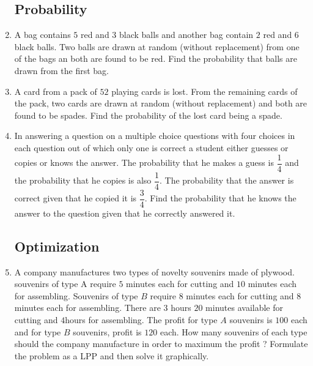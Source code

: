 \documentclass[12pt,-letter paper]{article}
\begin{document}
\begin{enumerate}
\subsection*{ Probability}
\item A bag contains $5$ red and $3$ black balls and another bag contain $2$ red and $6$ black balls. Two balls are drawn at random (without replacement) from one of the bags an both are found to be red. Find the probability that balls are drawn from the first bag.                 
\item A card from a pack of $52$  playing cards is lost. From the remaining cards of the pack, two cards are drawn at random (without replacement) and both are found to be spades. Find the probability of the lost card being a spade. 
\item In answering a question on a multiple choice questions with four choices in each question out of which only one is correct a student either guesses or copies or knows the answer. The probability that he makes a guess is $\dfrac{1}{4}$ and the probability that he copies is also $\dfrac{1}{4}$. The probability that the answer is correct given that he copied it is $\dfrac{3}{4}$. Find the probability that he knows the answer to the question given that he correctly answered it.
\subsection*{Optimization }
  \item A company manufactures two types of novelty souvenirs made of plywood. souvenirs of type A require $5$ minutes each for cutting and $10$ minutes each for assembling. Souvenirs of type $B$ require $8$ minutes each for cutting and $8$ minutes each for assembling. There are 3 hours $20$ minutes available for cutting and $4$hours for assembling. The profit for type $A$ souvenirs is \rupee$ 100$ each and for type $B$ souvenirs, profit is \rupee $120$ each. How many souvenirs of each type should the company manufacture in order to maximum the profit ? Formulate the problem as a LPP and then solve it graphically. 
\end{enumerate}
\end{document}

